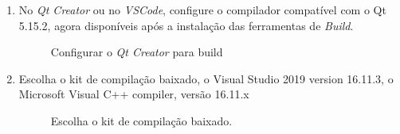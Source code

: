 \documentclass[a4paper,11pt]{article}
\newcommand{\qtcreator}{\textit{Qt Creator}}
\newcommand{\vscode}{\textit{VSCode}}
\begin{document}
\begin{enumerate}
\item No \qtcreator{} ou no \vscode{}, configure o compilador compatível com o Qt 5.15.2, agora disponíveis após a instalação das ferramentas de \textit{Build}.

\begin{figure}[H]
	\centering
	\caption{Configurar o \qtcreator{} para build}\label{fig:qt_tools_ext_config}
\end{figure}

\item Escolha o kit de compilação baixado, o Visual Studio 2019 version 16.11.3, o Microsoft Visual C++ compiler, versão 16.11.x

\begin{figure}[H]
	\centering
	\caption{Escolha o kit de compilação baixado.}\label{fig:qt_tools_ext_config_kit}
\end{figure}


\end{enumerate}
\end{document}
